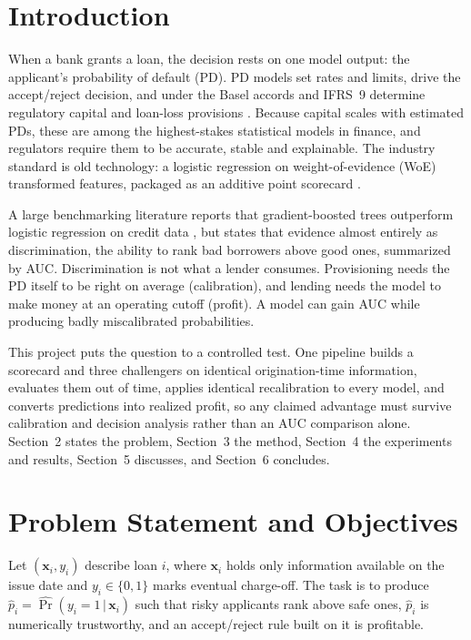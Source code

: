 \documentclass[a4paper,twocolumn,10pt]{article}
\begin{document}
\section{Introduction}

When a bank grants a loan, the decision rests on one model output: the applicant's probability of default (PD). PD models set rates and limits, drive the accept/reject decision, and under the Basel accords and IFRS~9 determine regulatory capital and loan-loss provisions \cite{basel2006}. Because capital scales with estimated PDs, these are among the highest-stakes statistical models in finance, and regulators require them to be accurate, stable and explainable. The industry standard is old technology: a logistic regression on weight-of-evidence (WoE) transformed features, packaged as an additive point scorecard \cite{siddiqi2006, hand1997}.

A large benchmarking literature reports that gradient-boosted trees outperform logistic regression on credit data \cite{lessmann2015, gunnarsson2021}, but states that evidence almost entirely as discrimination, the ability to rank bad borrowers above good ones, summarized by AUC. Discrimination is not what a lender consumes. Provisioning needs the PD itself to be right on average (calibration), and lending needs the model to make money at an operating cutoff (profit). A model can gain AUC while producing badly miscalibrated probabilities.

This project puts the question to a controlled test. One pipeline builds a scorecard and three challengers on identical origination-time information, evaluates them out of time, applies identical recalibration to every model, and converts predictions into realized profit, so any claimed advantage must survive calibration and decision analysis rather than an AUC comparison alone. Section~2 states the problem, Section~3 the method, Section~4 the experiments and results, Section~5 discusses, and Section~6 concludes.

\section{Problem Statement and Objectives}

Let $(\mathbf{x}_i, y_i)$ describe loan $i$, where $\mathbf{x}_i$ holds only information available on the issue date and $y_i\in\{0,1\}$ marks eventual charge-off. The task is to produce $\hat p_i=\widehat{\Pr}(y_i=1\,|\,\mathbf{x}_i)$ such that risky applicants rank above safe ones, $\hat p_i$ is numerically trustworthy, and an accept/reject rule built on it is profitable.
\end{document}
